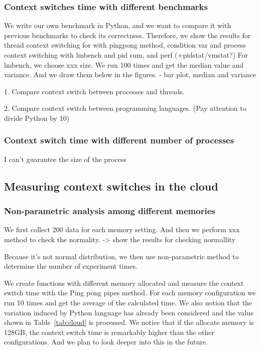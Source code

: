 \subsubsection{Context switches time with different benchmarks}
We write our own benchmark in Python, and we want to compare it with previous benchmarks to check its correctness. 
Therefore, we show the results for thread context switching for with pingpong method, condition var and process context switching with lmbench and pid sum, and perf (+pidstat/vmstat?)
For lmbench, we choose xxx size. We run 100 times and get the median value and variance. And we draw them below in the figures. - bar plot, median and variance

1. Compare context switch between processes and threads.

2. Compare context switch between programming languages. (Pay attention to divide Python by 10)

\subsubsection{Context switch time with different number of processes}

I can't guarantee the size of the process


\subsection{Measuring context switches in the cloud}

\subsubsection{Non-parametric analysis among different memories}

We first collect 200 data for each memory setting. And then we perform xxx method to check the normality. 
-> show the results for checking normallity

Because it's not normal distribution, we then use non-parametric method to determine the number of experiment times. 



We create functions with different memory allocated and measure the context switch time with the Ping pong pipes method.
For each memory configuration we run 10 times and get the average of the calculated time. 
We also notion that the variation induced by Python language has already been considered and the value shown in Table~\ref{tab:cloud} is processed.
We notice that if the allocate memory is 128GB, the context switch time is remarkably higher than the other configurations.
And we plan to look deeper into this in the future.

